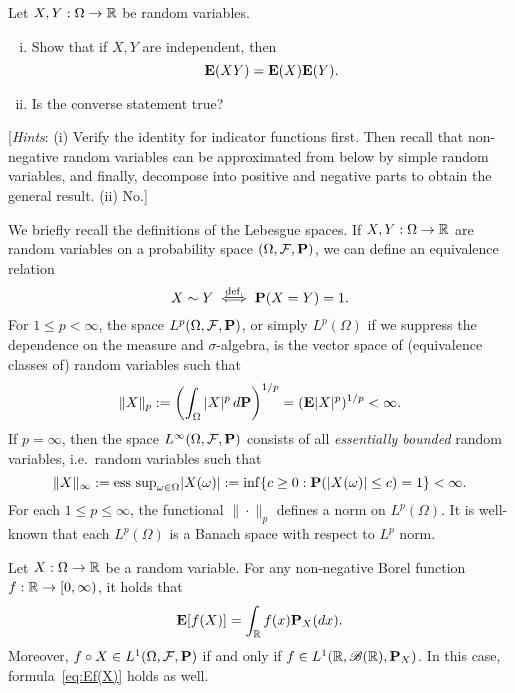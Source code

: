 \begin{exercise}[Important!]
    Let $X, Y:\Omega\to\mathbb{R}$ be random variables.
    \begin{enumerate}[(i)]
        \item Show that if $X,Y$ are independent, then
        \begin{equation*}
            \mathbf{E}(XY) = \mathbf{E}(X)\mathbf{E}(Y).
        \end{equation*}
        \item Is the converse statement true?
    \end{enumerate}
    [\emph{Hints}: (i) Verify the identity for indicator functions first. Then recall that non-negative random variables can be approximated from below by simple random variables, and finally, decompose into positive and negative parts to obtain the general result. (ii) No.]
\end{exercise}

We briefly recall the definitions of the Lebesgue spaces. If $X,Y:\Omega\to\mathbb{R}$ are random variables on a probability space $(\Omega,\mathcal{F},\mathbf{P})$, we can define an equivalence relation
\begin{equation*}
    X\sim Y \overset{\text{def.}}{\iff} \mathbf{P}(X=Y) = 1.
\end{equation*}
For $1\le p<\infty$, the space $L^p(\Omega,\mathcal{F},\mathbf{P})$, or simply $L^p(\Omega)$ if we suppress the dependence on the measure and $\sigma$-algebra, is the vector space of (equivalence classes of) random variables such that
\begin{equation*}
    \|X\|_p := \left(\int_\Omega |X|^p\,d\mathbf{P}\right)^{1/p} = (\mathbf{E}|X|^p)^{1/p}< \infty.
\end{equation*}
If $p=\infty$, then the space $L^\infty(\Omega,\mathcal{F},\mathbf{P})$ consists of all \emph{essentially bounded} random variables, i.e.\ random variables such that
\begin{equation*}
    \|X\|_\infty := \mathrm{ess\ sup}_{\omega\in\Omega}|X(\omega)| := \inf\{c\ge 0: \mathbf{P}(|X(\omega)|\le c)=1\} < \infty.
\end{equation*}
For each $1\le p\le\infty$, the functional $\|\cdot\|_p$ defines a norm on $L^p(\Omega)$. It is well-known that each $L^p(\Omega)$ is a Banach space with respect to $L^p$ norm.

\begin{proposition}
\label{prop:pushforward}
    Let $X:\Omega\to\mathbb{R}$ be a random variable. For any non-negative Borel function $f:\mathbb{R}\to [0,\infty)$, it holds that
    \begin{equation}
    \label{eq:Ef(X)}
        \mathbf{E}[f(X)] = \int_{\mathbb{R}} f(x) \mathbf{P}_X(dx).
    \end{equation}
    Moreover, $f\circ X\in L^1(\Omega,\mathcal{F},\mathbf{P})$ if and only if $f\in L^1(\mathbb{R},\mathscr{B}(\mathbb{R}),\mathbf{P}_X)$. In this case, formula~\eqref{eq:Ef(X)} holds as well.
\end{proposition}

